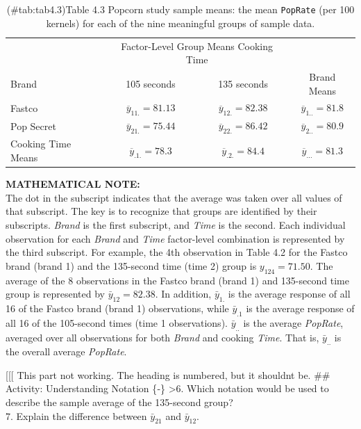 \documentclass[
]{report}
\begin{document}
\begin{table}[!h]
\centering
\caption{(\#tab:tab4.3)Table 4.3 Popcorn study sample means: the mean \texttt{PopRate} (per 100 kernels) for each of the nine meaningful groups of sample data.}
\centering
\begin{tabular}[t]{lccc}
\toprule
\multicolumn{1}{c}{ } & \multicolumn{2}{c}{Factor-Level Group Means Cooking Time} & \multicolumn{1}{c}{ } \\
\cmidrule(l{3pt}r{3pt}){2-3}
Brand & 105 seconds & 135 seconds & Brand Means\\
\midrule
Fastco & $\overline{y}_{11.} = 81.13$ & $\overline{y}_{12.} = 82.38$ & $\overline{y}_{1..} = 81.8$\\
Pop Secret & $\overline{y}_{21.} = 75.44$ & $\overline{y}_{22.} = 86.42$ & $\overline{y}_{2..} = 80.9$\\
Cooking Time Means & $\overline{y}_{.1.} = 78.3$ & $\overline{y}_{.2.} = 84.4$ & $\overline{y}_{...} = 81.3$\\
\bottomrule
\end{tabular}
\end{table}

\large

\textbf{MATHEMATICAL NOTE:}\\
The dot in the subscript indicates that the average was taken over all values of that subscript. The key is to recognize that groups are identified by their subscripts. \emph{Brand} is the first subscript, and \emph{Time} is the second. Each individual observation for each \emph{Brand} and \emph{Time} factor-level combination is represented by the third subscript. For example, the 4th observation in Table 4.2 for the Fastco brand (brand 1) and the 135-second time (time 2) group is \(y_{124} = 71.50\). The average of the 8 observations in the Fastco brand (brand 1) and 135-second time group is represented by \(\bar{y}_{12} = 82.38\). In addition, \(\bar{y}_{1.}\) is the average response of all 16 of the Fastco brand (brand 1) observations, while \(\bar{y}_{.1}\) is the average response of all 16 of the 105-second times (time 1 observations). \(\bar{y}_{..}\) is the average \emph{PopRate}, averaged over all observations for both \emph{Brand} and cooking \emph{Time}. That is, \(\bar{y}_{..}\) is the overall average \emph{PopRate}.
\normalsize

{[}{[}{[} This part not working. The heading is numbered, but it shouldnt be.
\#\# Activity: Understanding Notation \{‑\}
\textgreater6. Which notation would be used to describe the sample average of the 135-second group?\\
7. Explain the difference between \(\bar{y}_{21}\) and \(\bar{y}_{12}\).
\end{document}
